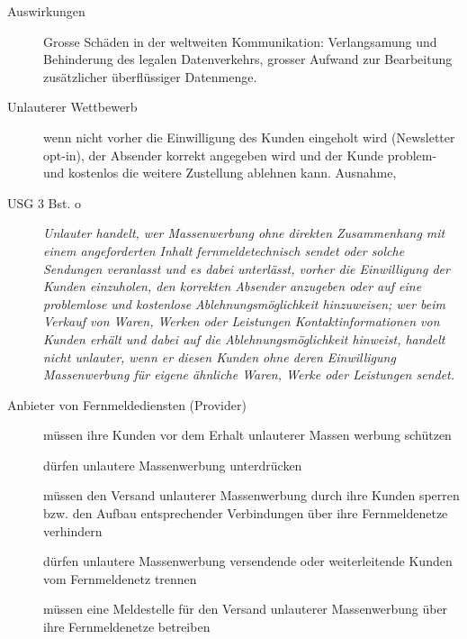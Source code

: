 \begin{description}
  \item[Auswirkungen] Grosse Schäden in der weltweiten Kommunikation: Verlangsamung und Behinderung des legalen Datenverkehrs, grosser Aufwand zur Bearbeitung zusätzlicher überflüssiger Datenmenge.
  \item[Unlauterer Wettbewerb] wenn nicht vorher die Einwilligung des Kunden eingeholt wird (Newsletter opt-in), der Absender korrekt angegeben wird und der Kunde problem- und kostenlos die weitere Zustellung ablehnen kann. Ausnahme, 
  \item[USG 3 Bst. o] \textit{Unlauter handelt, wer Massenwerbung ohne direkten Zusammenhang mit einem angeforderten Inhalt fernmeldetechnisch sendet oder solche Sendungen veranlasst und es dabei unterlässt, vorher die Einwilligung der Kunden einzuholen, den korrekten Absender anzugeben oder auf eine problemlose und kostenlose Ablehnungsmöglichkeit hinzuweisen; wer beim Verkauf von Waren, Werken oder Leistungen Kontaktinformationen von Kunden erhält und dabei auf die Ablehnungsmöglichkeit hinweist, handelt nicht unlauter, wenn er diesen Kunden ohne deren Einwilligung Massenwerbung für eigene ähnliche Waren, Werke oder Leistungen sendet.}
  \item[Anbieter von Fernmeldediensten (Provider)] 
  
  müssen ihre Kunden vor dem Erhalt unlauterer Massen  werbung schützen

  dürfen unlautere Massenwerbung unterdrücken

  müssen den Versand unlauterer Massenwerbung durch ihre Kunden sperren bzw. den Aufbau entsprechender Verbindungen über ihre Fernmeldenetze verhindern

  dürfen unlautere Massenwerbung versendende oder weiterleitende Kunden vom Fernmeldenetz trennen
  
  müssen eine Meldestelle für den Versand unlauterer Massenwerbung über ihre Fernmeldenetze betreiben
\end{description}
